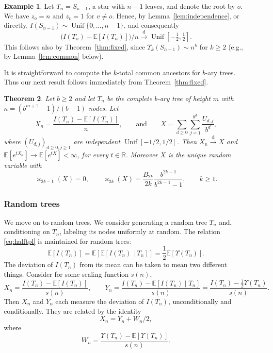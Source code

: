 \documentclass[11pt]{article}
\newcommand{\E}[1]{\mathbb{E} \left[#1\right]}
\def\R{\mathbb{R}}
\def\XX{X}
\def\YY{Y}
\def\ZZ{W}
\def\U{\Upsilon}
\newcommand{\dep}{d}
\newtheorem{theorem}{Theorem}
\numberwithin{theorem}{section}
\theoremstyle{definition}
\newtheorem{example}[theorem]{Example}
\newcommand{\Unif}{\mathop{\mathrm{Unif}}}
\numberwithin{equation}{section}
\newcommand{\refT}[1]{Theorem~\ref{#1}}
\newcommand{\refL}[1]{Lemma~\ref{#1}}
\newcommand\kk{\varkappa}
\newcommand\set[1]{\ensuremath{\{#1\}}}
\newcommand\bigpar[1]{\bigl(#1\bigr)}
\newcommand{\too}{\longrightarrow}
\newcommand\dto{\overset{\mathrm{d}}{\too}}
\begin{document}
\begin{example}
  Let
$T_n=S_{n-1}$, a star with $n-1$ leaves, and denote the root by $o$.
We have $z_o=n$ and $z_v=1$ for $v\neq o$. Hence, by
\refL{lem:independence}, 
or directly,
$I(S_{n-1})\sim \Unif\set{0,\dots,n-1}$, and consequently
\begin{equation}
  \bigpar{I(T_n)-\E{I(T_n)}}/n \dto \Unif[-\tfrac12,\tfrac12].
\end{equation}
This follows also by \refT{thm:fixed}, since $\Upsilon_k(S_{n-1})\sim n^k$
for $k\ge2$ (e.g., by \refL{lem:common} below).
\end{example}

It is straightforward to compute the \(k\)-total common ancestors for \(b\)-ary trees. Thus our next result follows
immediately from \refT{thm:fixed}.
\begin{theorem}\label{thm:complete}
    Let $b\geq 2$ and let \(T_n\) be the complete $b$-ary tree 
    of height \(m\) with $n = (b^{m + 1} - 1)/(b-1)$ nodes.
    Let
    \[
        X_n 
        = \frac{I(T_n) - \E{I(T_n)}}{n}
        ,
        \qquad
        \text{and}
        \qquad
        X = \sum_{\dep \ge 0} \sum_{j=1}^{b^\dep} \frac{U_{\dep,j}}{b^\dep},
    \]
    where \( (U_{\dep, j})_{\dep \ge 0, j \ge 1}\) are independent \(\Unif[-1/2,1/2]\).
    Then $X_n\dto X$ and
    \(
        \E{e^{tX_n}} \to
        \E{e^{t X}} <\infty
    \),
    for every \(t \in \R\).
    Moreover \(X\) is the unique random variable with
    \begin{equation}\label{kkcomplete}
        \kk_{2k-1}(X) = 0, \qquad 
\kk_{2k}(X) = \frac{B_{2k}}{2k}\frac{b^{2k-1}}{b^{2k-1}-1}, \qquad k \ge 1.
    \end{equation}
\end{theorem}

\subsubsection*{Random trees}

We move on to random trees. We consider generating a random tree $T_n$ and, conditioning on $T_n$, labeling its nodes uniformly at random. The relation \eqref{eq:halftpl} is maintained for random trees:
\begin{equation}\label{eq:randomhalftpl}
\E{I(T_n)} = \E{\E{I(T_n)\mid T_n}} = \frac12\E{\U(T_n)}.
\end{equation}
The deviation of $I(T_n)$ from its mean can be taken to mean two different
things. Consider for some scaling function $s(n)$, 
\begin{equation}\label{eq:xy}
\XX_n = \frac{I(T_n) - \E{I(T_n)}}{s(n)}, \qquad 
\YY_n =  \frac{I(T_n) - \E{I(T_n)\mid T_n}}{s(n)}
=\frac{I(T_n) - \frac12\U(T_n)}{s(n)}.
\end{equation}
Then $\XX_n$ and $\YY_n$
each measure the deviation of $I(T_n)$, unconditionally and conditionally.
They are related by the identity 
\begin{equation}
  \label{eq:xy:z}
\XX_n = \YY_n + \ZZ_n/2,
\end{equation}
where
\begin{equation}\label{eq:zz}
\ZZ_n = \frac{\U(T_n) - \E{\U(T_n)}}{s(n)}.
\end{equation}
\end{document}
